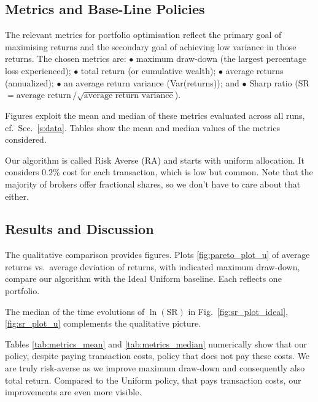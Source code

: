 \subsection{Metrics and Base-Line Policies} \label{s:metrics}
The relevant metrics for portfolio optimisation reflect the primary goal of maximising returns and the secondary goal of achieving low variance in those returns. The chosen metrics are: $\bullet$ maximum draw-down (the largest percentage loss experienced); $\bullet$ total return (or cumulative wealth);
$\bullet$ average returns (annualized);  $\bullet$ an average return variance (Var(returns)); and $\bullet$ Sharp ratio (SR$=
\mbox{average return}\,/\sqrt{\mbox{average return variance}}$).

Figures exploit the mean and median of these metrics evaluated across all runs, cf.\ Sec.\
\ref{s:data}. Tables show the mean and median values of the metrics considered.

Our algorithm is called Risk Averse (RA) and starts with uniform allocation. It considers $0.2\%$ cost for each transaction, which is low but common. Note that the majority of brokers offer fractional shares, so we don't have to care about that either.


\subsection{Results and Discussion} \label{s:results}
The qualitative comparison provides figures. Plots \ref{fig:pareto_plot_u} of average returns vs.\ average deviation of returns, with indicated maximum draw-down, compare our algorithm with the Ideal Uniform baseline. Each  reflects one portfolio.

The median of the time evolutions of $\ln(\mbox{SR})$ in Fig.\
 \ref{fig:sr_plot_ideal}, \ref{fig:sr_plot_u} complements the qualitative picture.

 Tables \ref{tab:metrics_mean} and \ref{tab:metrics_median} numerically show that our policy, despite paying transaction costs,  policy that does not pay these costs. We are truly risk-averse as we improve maximum draw-down and consequently also total return. Compared to the Uniform policy, that pays transaction costs, our improvements are even more visible.


